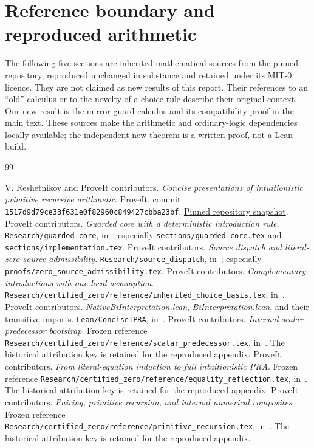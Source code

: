 \documentclass[11pt]{article}
\theoremstyle{definition}\newtheorem{definition}[theorem]{Definition}
\begin{document}
\section{Reference boundary and reproduced arithmetic}
The following five sections are inherited mathematical sources from the
pinned repository, reproduced unchanged in substance and retained under
its MIT-0 licence.  They are not claimed as new results of this report.
Their references to an ``old'' calculus or to the novelty of a choice rule
describe their original context.  Our new result is the mirror-guard
calculus and its compatibility proof in the main text.  These sources make
the arithmetic and ordinary-logic dependencies locally available; the
independent new theorem is a written proof, not a Lean build.





\begin{thebibliography}{99}
\small\raggedright
{} V. Reshetnikov and ProveIt contributors.
\emph{Concise presentations of intuitionistic primitive recursive arithmetic}.
ProveIt, commit \texttt{1517d9d79ce33f631e0f82960c849427cbba23bf}.
\href{https://github.com/VladimirReshetnikov/ProveIt/tree/1517d9d79ce33f631e0f82960c849427cbba23bf/Logic/PrimitiveRecursiveArithmetic/ConciseIPRA}{Pinned repository snapshot}.
 ProveIt contributors. \emph{Guarded core with a deterministic introduction rule}.
\texttt{Research/guarded\_core}, in~\cite{snapshot}; especially
\texttt{sections/guarded\_core.tex} and \texttt{sections/implementation.tex}.
 ProveIt contributors. \emph{Source dispatch and literal-zero source admissibility}.
\texttt{Research/source\_dispatch}, in~\cite{snapshot}; especially
\texttt{proofs/zero\_source\_admissibility.tex}.
 ProveIt contributors. \emph{Complementary introductions with one local assumption}.
\texttt{Research/certified\_zero/reference/inherited\_choice\_basis.tex}, in~\cite{snapshot}.
 ProveIt contributors. \emph{NativeBiInterpretation.lean},
\emph{BiInterpretation.lean}, and their transitive imports.
\texttt{Lean/ConciseIPRA}, in~\cite{snapshot}.
 ProveIt contributors. \emph{Internal scalar predecessor bootstrap}.
Frozen reference \texttt{Research/certified\_zero/reference/scalar\_predecessor.tex},
in~\cite{snapshot}.  The historical attribution key is retained for the reproduced appendix.
 ProveIt contributors. \emph{From literal-equation induction to full intuitionistic PRA}.
Frozen reference \texttt{Research/certified\_zero/reference/equality\_reflection.tex},
in~\cite{snapshot}.  The historical attribution key is retained for the reproduced appendix.
 ProveIt contributors. \emph{Pairing, primitive recursion, and internal numerical composites}.
Frozen reference \texttt{Research/certified\_zero/reference/primitive\_recursion.tex},
in~\cite{snapshot}.  The historical attribution key is retained for the reproduced appendix.
\end{thebibliography}
\end{document}
